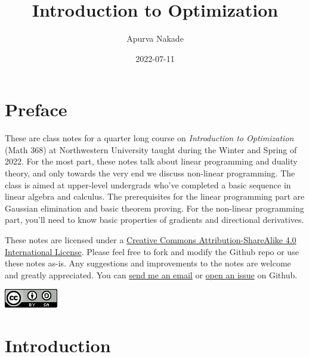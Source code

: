 \documentclass[
]{book}
\title{Introduction to Optimization}
\author{Apurva Nakade}
\date{2022-07-11}
\theoremstyle{definition}
\theoremstyle{definition}
\theoremstyle{definition}
\theoremstyle{definition}
\theoremstyle{remark}
\begin{document}
\maketitle

\thispagestyle{empty}


{
\setcounter{tocdepth}{2}
\tableofcontents
}
\hypertarget{preface}{%
\chapter*{Preface}\label{preface}}


These are class notes for a quarter long course on \emph{Introduction to Optimization} (Math 368) at Northwestern University taught during the Winter and Spring of 2022.
For the most part, these notes talk about linear programming and duality theory, and only towards the very end we discuss non-linear programming.
The class is aimed at upper-level undergrads who've completed a basic sequence in
linear algebra and calculus.
The prerequisites for the linear programming part are Gaussian elimination and basic theorem proving.
For the non-linear programming part, you'll need to know basic properties of gradients and directional derivatives.

These notes are licensed under a \href{\%5Bhttp://creativecommons.org/licenses/by-sa/4.0/\%5D(http://creativecommons.org/licenses/by-sa/4.0/)}{Creative Commons Attribution-ShareAlike 4.0 International License}.
Please feel free to fork and modify the Github repo or use these notes as-is.
Any suggestions and improvements to the notes are welcome and greatly appreciated.
You can \href{mailto:apurva.nakade@northwestern.edu}{send me an email} or \href{https://github.com/apurvanakade/Introduction-to-Optimization/issues}{open an issue} on Github.

\includegraphics{images/cc-by-sa-4.png}

\hypertarget{introduction}{%
\chapter{Introduction}\label{introduction}}
\end{document}
